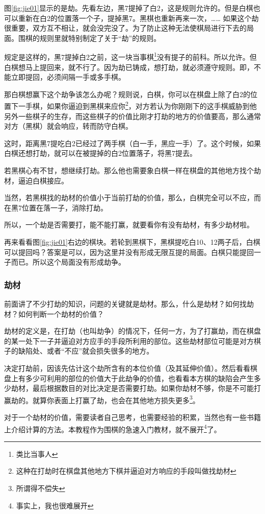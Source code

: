 \documentclass[12pt，a4paper, titlepage]{article}
\begin{document}
图\ref{fig:jie01}显示的是劫。先看左边，黑7提掉了白2，这是规则允许的。但是白棋也可以重新在白2的位置落一个子，提掉黑7。黑棋也重新再来一次，…… 如果这个劫很重要，双方互不相让，就会没完没了。为了防止这种无法使棋局进行下去的局面。围棋的规则里就特别制定了关于“劫”的规则。

规定是这样的，黑7提掉白2之前，这一块当事棋\footnote{类比当事人}没有提子的前科。所以允许。但白棋想马上提回来，就不行了。因为劫已铸成，想打劫，就必须遵守规则。即，不能立即提回，必须间隔一手或多手棋。

那白棋想赢下这个劫争该怎么办呢？规则说，白棋，你可以在棋盘上除了白2的位置下一手棋，如果你逼迫到黑棋来应你\footnote{这种在打劫时在棋盘其他地方下棋并逼迫对方响应的手段叫做找劫材}，对方若认为你刚刚下的这手棋威胁到他另外一些棋子的生存，而这些棋子的价值比刚才打劫的地方的价值要高，那么通常对方（黑棋）就会响应，转而防守白棋。

这时，距离黑7提吃白2已经过了两手棋（白一手，黑应一手）了。这个时候，如果白棋还想打劫，就可以在被提掉的白2位置落子，将黑7提去。

若黑棋心有不甘，想继续打劫。那么他也需要象白棋一样在棋盘的其他地方找个劫材，逼迫白棋接应。

当然，若黑棋找的劫材的价值小于当前打劫的价值，那么，白棋完全可以不应，而在黑7位置在落一子，消除打劫。

所以，一个劫是否需要打，能不能打赢，就要看你有没有劫材，有多少劫材啦。

再来看看图\ref{fig:jie01}右边的棋块。若轮到黑棋下，黑棋提吃白10、12两子后，白棋可以提回吗？答案是可以，因为这里并没有形成无限互提的局面。白棋只能提回一子而已。所以这个局面没有形成劫争。

\subsubsection{劫材}
前面讲了不少打劫的知识，问题的关键就是劫材。那么，什么是劫材？如何找劫材？如何判断一个劫材的价值？

劫材的定义是，在打劫（也叫劫争）的情况下，任何一方，为了打赢劫，而在棋盘的某一处下一子并逼迫对方应手的手段所利用的部位。这些劫材部位可能是对方棋子的缺陷处、或者“不应”就会损失很多的地方。

决定打劫前，因该先估计这个劫所含有的本位价值（及其延伸价值）。然后看看棋盘上有多少可利用的部位的价值大于此劫争的价值，也看看本方棋的缺陷会产生多少劫材，最后根据数目的对比决定是否需要打劫。如果你劫材不够，你是不可能打赢劫的。就算你表面上打赢了劫，也会在其他地方损失更多\footnote{所谓得不偿失}。

对于一个劫材的价值，需要读者自己思考，也需要经验的积累，当然也有一些书籍上介绍计算的方法。本教程作为围棋的急速入门教材，就不展开\footnote{事实上，我也很难展开}了。
\end{document}
